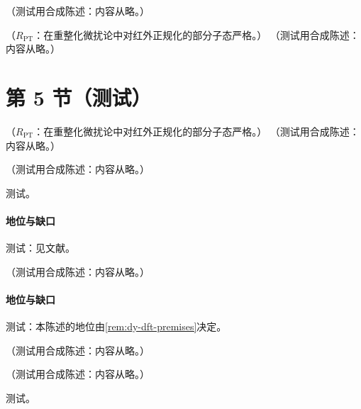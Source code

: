 \begin{definition}[Glauber 区]\label{def:ir-glauber}
（测试用合成陈述：内容从略。）
\end{definition}

\begin{proposition}\label{prop:ir-glauber-trapping}
（$R_{\mathrm{PT}}$：在重整化微扰论中对红外正规化的部分子态严格。）
（测试用合成陈述：内容从略。）
\end{proposition}

\section{第 5 节（测试）}\label{sec:ir-glauber}

\begin{theorem}\label{thm:ir-bn-qed}
（$R_{\mathrm{PT}}$：在重整化微扰论中对红外正规化的部分子态严格。）
（测试用合成陈述：内容从略。）
\end{theorem}

\begin{theorem}\label{thm:ir-kln}
（测试用合成陈述：内容从略。）
\end{theorem}
\begin{proofsketch}测试。\end{proofsketch}
\paragraph{地位与缺口}测试：见文献。

\begin{proposition}\label{prop:ir-bn-failure}
（测试用合成陈述：内容从略。）
\end{proposition}
\paragraph{地位与缺口}测试：本陈述的地位由\cref{rem:dy-dft-premises}决定。

\begin{definition}[红外安全可观测量]\label{def:ir-safe}
（测试用合成陈述：内容从略。）
\end{definition}

\begin{theorem}\label{thm:ir-safe-finite}
（测试用合成陈述：内容从略。）
\end{theorem}
\begin{proofsketch}测试。\end{proofsketch}
